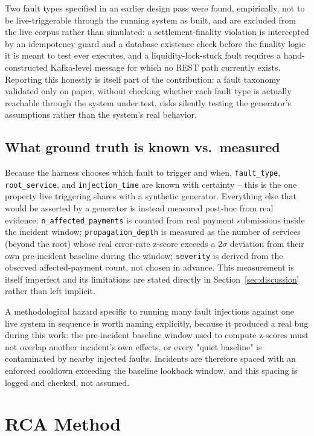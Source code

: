\documentclass[conference]{IEEEtran}
\begin{document}
Two fault types specified in an earlier design pass were found, empirically,
not to be live-triggerable through the running system as built, and are
excluded from the live corpus rather than simulated: a settlement-finality
violation is intercepted by an idempotency guard and a database existence
check before the finality logic it is meant to test ever executes, and a
liquidity-lock-stuck fault requires a hand-constructed Kafka-level message
for which no REST path currently exists. Reporting this honestly is itself
part of the contribution: a fault taxonomy validated only on paper, without
checking whether each fault type is actually reachable through the system
under test, risks silently testing the generator's assumptions rather than
the system's real behavior.

\subsection{What ground truth is known vs.\ measured}
Because the harness chooses which fault to trigger and when, \texttt{fault\_type},
\texttt{root\_service}, and \texttt{injection\_time} are known with certainty --
this is the one property live triggering shares with a synthetic generator.
Everything else that would be asserted by a generator is instead measured
post-hoc from real evidence: \texttt{n\_affected\_payments} is counted from
real payment submissions inside the incident window;
\texttt{propagation\_depth} is measured as the number of services (beyond
the root) whose real error-rate z-score exceeds a 2$\sigma$ deviation from
their own pre-incident baseline during the window; \texttt{severity} is
derived from the observed affected-payment count, not chosen in advance.
This measurement is itself imperfect and its limitations are stated
directly in Section~\ref{sec:discussion} rather than left implicit.

A methodological hazard specific to running many fault injections against
one live system in sequence is worth naming explicitly, because it produced
a real bug during this work: the pre-incident baseline window used to
compute z-scores must not overlap another incident's own effects, or every
"quiet baseline" is contaminated by nearby injected faults. Incidents are
therefore spaced with an enforced cooldown exceeding the baseline lookback
window, and this spacing is logged and checked, not assumed.

\section{RCA Method}
\label{sec:method}
\end{document}
